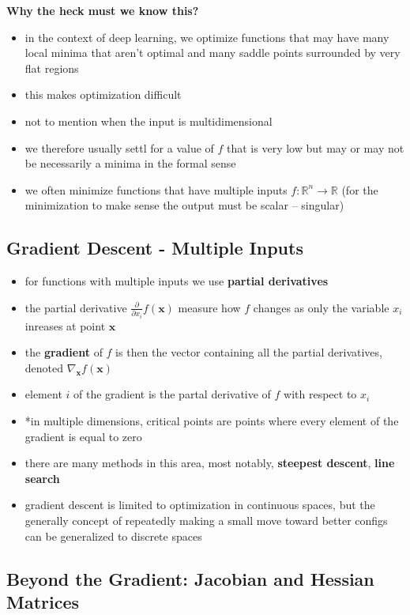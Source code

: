 \documentclass[11pt, twocolumn]{report}
\def\realnumbers{\mathbb{R}}
\begin{document}
\textbf{Why the heck must we know this?}
\begin{itemize}
  \item in the context of deep learning, we optimize functions that may have
    many local minima that aren't optimal and many saddle points surrounded by
    very flat regions
  \item this makes optimization difficult
  \item not to mention when the input is multidimensional
  \item we therefore usually settl for a value of $f$ that is very low but may
    or may not be necessarily a minima in the formal sense
  \item we often minimize functions that have multiple inputs $f :
    \realnumbers^n \to \realnumbers$ (for the minimization to make sense the
    output must be scalar -- singular)
\end{itemize}

\subsection{Gradient Descent - Multiple Inputs}
\begin{itemize}
  \item for functions with multiple inputs we use \textbf{partial derivatives}
  \item the partial derivative $\frac{\partial}{\partial x_i} f(\bm{x})$
    measure how $f$ changes as only the variable $x_i$ inreases at point
    $\bm{x}$
  \item the \textbf{gradient} of $f$ is then the vector containing all the
    partial derivatives, denoted $\nabla_{\bm{x}} f(\bm{x})$
  \item element $i$ of the gradient is the partal derivative of $f$ with
    respect to $x_i$
  \item *in multiple dimensions, critical points are points where every element
    of the gradient is equal to zero
  \item there are many methods in this area, most notably, \textbf{steepest
      descent}, \textbf{line search}
  \item gradient descent is limited to optimization in continuous
    spaces, but the generally concept of repeatedly making a small move toward
    better configs can be generalized to discrete spaces
\end{itemize}

\subsection{Beyond the Gradient: Jacobian and Hessian Matrices}
\end{document}
